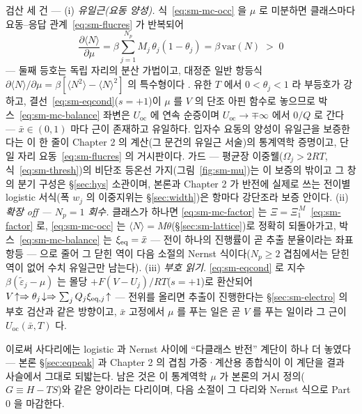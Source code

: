 \begin{verifybox}
검산 세 건 --- (i) \emph{유일근(요동 양성).} 식~\eqref{eq:sm-mc-occ} 을 $\mu$ 로 미분하면 클래스마다
요동--응답 관계~\eqref{eq:sm-flucres} 가 반복되어
\begin{equation}
\frac{\partial\langle N\rangle}{\partial\mu}
=\beta\sum_{j=1}^{N_p}M_j\,\theta_j(1-\theta_j)
=\beta\,\mathrm{var}(N)\;>\;0
\label{eq:sm-mc-fluc}
\end{equation}
--- 둘째 등호는 독립 자리의 분산 가법이고, 대정준 일반 항등식
$\partial\langle N\rangle/\partial\mu=\beta[\langle N^2\rangle-\langle N\rangle^2]$ 의 특수형이다
\cite{mcquarrie1976}. 유한 $T$ 에서 $0<\theta_j<1$ 라 부등호가 강하고, 결선~\eqref{eq:sm-eqcond}($s{=}+1$)이
$\mu$ 를 $V$ 의 단조 아핀 함수로 놓으므로 박스~\eqref{eq:sm-mc-balance} 좌변은 $U_\mathrm{oc}$ 에 연속
순증이며 $U_\mathrm{oc}\to\mp\infty$ 에서 $0/Q$ 로 간다 --- $\bar x\in(0,1)$ 마다 근이 존재하고 유일하다.
입자수 요동의 양성이 유일근을 보증한다는 이 한 줄이 Chapter 2 의 계산(그 문건의 유일근 서술)의 통계역학
증명이고, 단일 자리 요동~\eqref{eq:sm-flucres} 의 거시판이다. 가드 --- 평균장 이중웰($\Omega_j>2RT$,
식~\eqref{eq:sm-thresh})의 비단조 등온선 가지(그림~\ref{fig:sm-mu})는 이 보증의 밖이고 그 창의 분기 구성은
\S\ref{sec:hys} 소관이며, 본론과 Chapter 2 가 반전에 실제로 쓰는 전이별 logistic 서식(폭 $w_j$ 의 이중지위는
\S\ref{sec:width})은 항마다 강단조라 보증 안이다. (ii) \emph{확장 off --- $N_p=1$ 회수.} 클래스가 하나면
\eqref{eq:sm-mc-factor} 는 $\Xi=\Xi_1^{\,M}$~\eqref{eq:sm-factor} 로, \eqref{eq:sm-mc-occ} 는
$\langle N\rangle=M\theta$(\S\ref{sec:sm-lattice})로 정확히 되돌아가고, 박스~\eqref{eq:sm-mc-balance} 는
$\xi_{\mathrm{eq}}=\bar x$ --- 전이 하나의 진행률이 곧 추출 분율이라는 좌표 항등 --- 으로 줄어 그 닫힌 역이 다음 소절의
Nernst 식이다($N_p\ge2$ 겹침에서는 닫힌 역이 없어 수치 유일근만 남는다). (iii) \emph{부호 읽기.}
\eqref{eq:sm-eqcond} 로 지수 $\beta(\tilde\varepsilon_j-\mu)$ 는 몰당 $+F(V-U_j)/RT$($s{=}+1$)로 환산되어
$V\!\uparrow\Rightarrow\theta_j\!\downarrow\Rightarrow\sum_jQ_j\xi_{\mathrm{eq},j}\!\uparrow$ --- 전위를 올리면 추출이
진행한다는 \S\ref{sec:sm-electro} 의 부호 검산과 같은 방향이고, $\bar x$ 고정에서 $\mu$ 를 푸는 일은 곧 $V$
를 푸는 일이라 그 근이 $U_\mathrm{oc}(\bar x,T)$ 다.
\end{verifybox}

이로써 사다리에는 logistic 과 Nernst 사이에 ``다클래스 반전'' 계단이 하나 더 놓였다 --- 본론
\S\ref{sec:eqpeak} 과 Chapter 2 의 겹침 가중·계산용 종합식이 이 계단을 결과 사슬에서 그대로 되밟는다. 남은
것은 이 통계역학 $\mu$ 가 본론의 거시 정의($G\equiv H-TS$)와 같은 양이라는 다리이며, 다음 소절이 그 다리와
Nernst 식으로 Part 0 을 마감한다.

